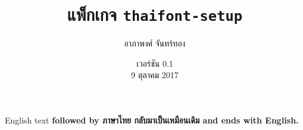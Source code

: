 \documentclass[11pt]{ltxguide}
\title{แพ็กเกจ \textlatin{\texttt{thaifont-setup}}}
\author{อาภาพงศ์ จันทร์ทอง}
\date{เวอร์ชัน 0.1\\9 ตุลาคม 2017}
\begin{document}
\maketitle

\latintext
English text
\bfseries
followed by
\thaitext
ภาษาไทย
\mdseries
กลับมาเป็นเหมือนเดิม
\latintext
and ends with English.
\end{document}
